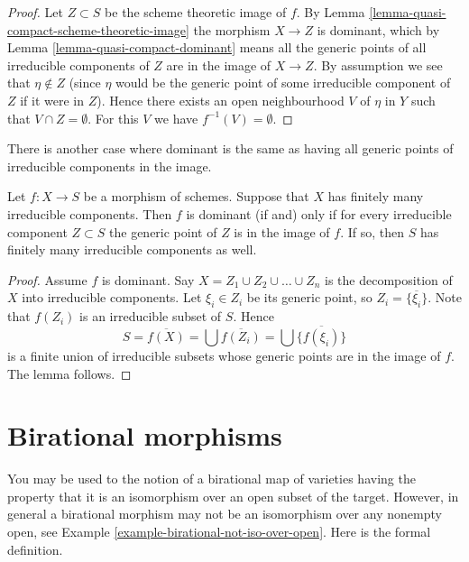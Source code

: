 \begin{proof}
Let $Z \subset S$ be the scheme theoretic image of $f$.
By Lemma \ref{lemma-quasi-compact-scheme-theoretic-image}
the morphism $X \to Z$ is dominant, which by
Lemma \ref{lemma-quasi-compact-dominant}
means all the generic points of all irreducible components of $Z$
are in the image of $X \to Z$. By assumption we see that
$\eta \not \in Z$ (since $\eta$ would be the generic 
point of some irreducible component of $Z$ if it were in $Z$).
Hence there exists an open neighbourhood $V$ of $\eta$ in $Y$
such that $V \cap Z = \emptyset$. For this $V$ we have
$f^{-1}(V) = \emptyset$.
\end{proof}

\noindent
There is another case where dominant is the same as having all
generic points of irreducible components in the image.

\begin{lemma}
\label{lemma-dominant-finite-number-irreducible-components}
Let $f : X \to S$ be a morphism of schemes.
Suppose that $X$ has finitely many irreducible components.
Then $f$ is dominant (if and) only if for every irreducible
component $Z \subset S$ the generic point of $Z$ is in the
image of $f$. If so, then $S$ has finitely many irreducible
components as well.
\end{lemma}

\begin{proof}
Assume $f$ is dominant.
Say $X = Z_1 \cup Z_2 \cup \ldots \cup Z_n$ is the decomposition
of $X$ into irreducible components. Let $\xi_i \in Z_i$ be
its generic point, so $Z_i = \overline{\{\xi_i\}}$.
Note that $f(Z_i)$ is an irreducible subset of $S$.
Hence
$$
S = \overline{f(X)} = \bigcup \overline{f(Z_i)} =
\bigcup \overline{\{f(\xi_i)\}}
$$
is a finite union of irreducible subsets whose generic
points are in the image of $f$. The lemma follows.
\end{proof}






\section{Birational morphisms}
\label{section-birational}

\noindent
You may be used to the notion of a birational map of varieties
having the property that it is an isomorphism over an open subset
of the target. However, in general a birational morphism may
not be an isomorphism over any nonempty open, see
Example \ref{example-birational-not-iso-over-open}.
Here is the formal definition.

